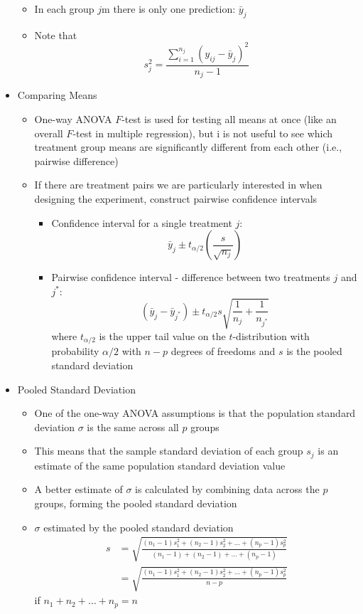 \documentclass[12pt]{article}
\begin{document}
\begin{itemize}
\begin{itemize}
\item In each group $j$m there is only one prediction: $\bar{y}_j$
\item Note that $$s_j^2 = \frac{\sum_{i=1}^{n_j} (y_{ij} - \bar{y}_j)^2}{n_j - 1} $$ \end{itemize} 
\item Comparing Means \begin{itemize} 
\item One-way ANOVA $F$-test is used for testing all means at once (like an overall $F$-test in multiple regression), but i is not useful to see which treatment group means are significantly different from each other (i.e., pairwise difference) 
\item If there are treatment pairs we are particularly interested in when designing the experiment, construct pairwise confidence intervals \begin{itemize} 
\item Confidence interval for a single treatment $j$: $$ \bar{y}_j \pm t_{\alpha / 2} \left( \frac{s}{\sqrt{n_j}} \right) $$ 
\item Pairwise confidence interval - difference between two treatments $j$ and $j^*$:
$$ (\bar{y}_j - \bar{y}_{j^*}) \pm t_{\alpha/2}s \sqrt{\frac{1}{n_j} + \frac{1}{n_{j^*}}} $$ where $t_{\alpha/2}$ is the upper tail value on the $t$-distribution with probability $\alpha/2$ with $n-p$ degrees of freedoms and $s$ is the pooled standard deviation \end{itemize} \end{itemize}
\item Pooled Standard Deviation \begin{itemize} 
\item One of the one-way ANOVA assumptions is that the population standard deviation $\sigma$ is the same across all $p$ groups 
\item This means that the sample standard deviation of each group $s_j$ is an estimate of the same population standard deviation value 
\item A better estimate of $\sigma$ is calculated by combining data across the $p$ groups, forming the pooled standard deviation 
\item $\sigma$ estimated by the pooled standard deviation 
$$ \begin{aligned} s &= \sqrt{\frac{(n_1 - 1)s_1^2 + (n_2 - 1)s_2^2 + \dots + (n_p - 1)s_p^2}{(n_1 - 1) + (n_2 - 1) + \dots + (n_p - 1)}} \\ &= \sqrt{ \frac{(n_1 - 1)s_1^2 + (n_2 - 1)s_2^2 + \dots + (n_p - 1)s_p^2}{n-p}} \end{aligned} $$ if $n_1 + n_2 + \dots + n_p = n$ 

\end{itemize}
\end{itemize}
\end{document}
